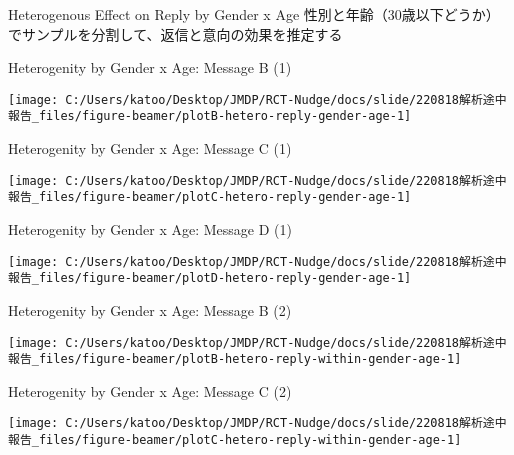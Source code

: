 \documentclass[
      aspectratio=169,
        12pt,
    ]{beamer}
\begin{document}
\begin{frame}{Heterogenous Effect on Reply by Gender x Age}
\protect\hypertarget{heterogenous-effect-on-reply-by-gender-x-age}{}
性別と年齢（30歳以下どうか）でサンプルを分割して、返信と意向の効果を推定する
\end{frame}

\begin{frame}{Heterogenity by Gender x Age: Message B (1)}
\protect\hypertarget{heterogenity-by-gender-x-age-message-b-1}{}
\begin{center}\texttt{[image: C:/Users/katoo/Desktop/JMDP/RCT-Nudge/docs/slide/220818解析途中報告\_files/figure-beamer/plotB-hetero-reply-gender-age-1]} \end{center}
\end{frame}

\begin{frame}{Heterogenity by Gender x Age: Message C (1)}
\protect\hypertarget{heterogenity-by-gender-x-age-message-c-1}{}
\begin{center}\texttt{[image: C:/Users/katoo/Desktop/JMDP/RCT-Nudge/docs/slide/220818解析途中報告\_files/figure-beamer/plotC-hetero-reply-gender-age-1]} \end{center}
\end{frame}

\begin{frame}{Heterogenity by Gender x Age: Message D (1)}
\protect\hypertarget{heterogenity-by-gender-x-age-message-d-1}{}
\begin{center}\texttt{[image: C:/Users/katoo/Desktop/JMDP/RCT-Nudge/docs/slide/220818解析途中報告\_files/figure-beamer/plotD-hetero-reply-gender-age-1]} \end{center}
\end{frame}

\begin{frame}{Heterogenity by Gender x Age: Message B (2)}
\protect\hypertarget{heterogenity-by-gender-x-age-message-b-2}{}
\begin{center}\texttt{[image: C:/Users/katoo/Desktop/JMDP/RCT-Nudge/docs/slide/220818解析途中報告\_files/figure-beamer/plotB-hetero-reply-within-gender-age-1]} \end{center}
\end{frame}

\begin{frame}{Heterogenity by Gender x Age: Message C (2)}
\protect\hypertarget{heterogenity-by-gender-x-age-message-c-2}{}
\begin{center}\texttt{[image: C:/Users/katoo/Desktop/JMDP/RCT-Nudge/docs/slide/220818解析途中報告\_files/figure-beamer/plotC-hetero-reply-within-gender-age-1]} \end{center}
\end{frame}
\end{document}

